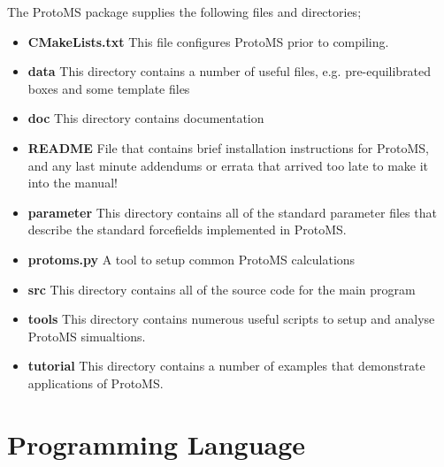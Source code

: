 \documentclass[letterpaper,10pt,english]{manual}
\begin{document}
The ProtoMS package supplies the following files and directories;
\begin{itemize}
\item {} 
\textbf{CMakeLists.txt} This file configures ProtoMS prior to compiling.

\item {} 
\textbf{data} This directory contains a number of useful files, e.g. pre-equilibrated boxes and some template files

\item {} 
\textbf{doc} This directory contains documentation

\item {} 
\textbf{README} File that contains brief installation instructions for ProtoMS, and any last minute addendums or errata that arrived too late to make it into the manual!

\item {} 
\textbf{parameter} This directory contains all of the standard parameter files that describe the standard forcefields implemented in ProtoMS.

\item {} 
\textbf{protoms.py} A tool to setup common ProtoMS calculations

\item {} 
\textbf{src} This directory contains all of the source code for the main program

\item {} 
\textbf{tools} This directory contains numerous useful scripts to setup and analyse ProtoMS simualtions.

\item {} 
\textbf{tutorial} This directory contains a number of examples that demonstrate applications of ProtoMS.

\end{itemize}


\hypertarget{fortran77}{}\section{Programming Language}
\end{document}
